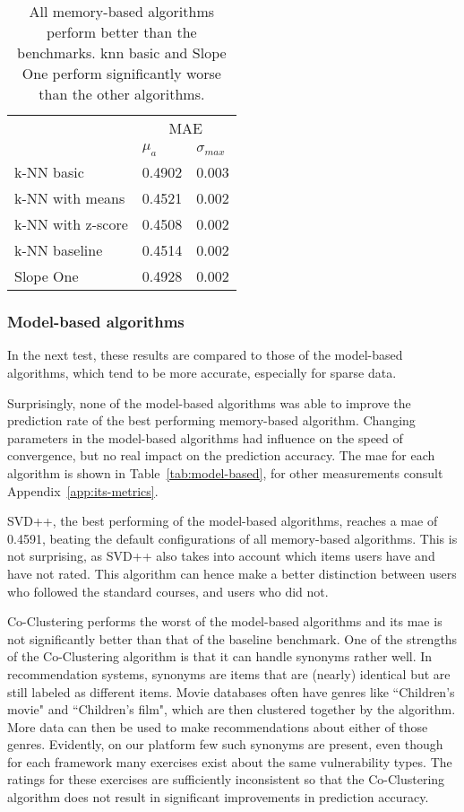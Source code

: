 \begin{table}
    \centering
    \caption[Prediction performance of memory-based algorithms]{All memory-based algorithms perform better than the benchmarks. \gls{knn} basic and Slope One perform significantly worse than the other algorithms.}
    \label{tab:memory-based}
    \small
    \begin{tabular}{l ll}
                 & \multicolumn{2}{c}{MAE}\\
    \cline{2-3} 
    & $\mu_a$ & $\sigma_{max}$\\
    \hline
k-NN basic        & 0.4902 & 0.003 \\ 
k-NN with means   & 0.4521 & 0.002 \\ 
k-NN with z-score & 0.4508 & 0.002 \\ 
k-NN baseline     & 0.4514 & 0.002 \\ 
Slope One         & 0.4928 & 0.002 \\
    \end{tabular}
\end{table}

\subsubsection{Model-based algorithms}
In the next test, these results are compared to those of the model-based algorithms, which tend to be more accurate, especially for sparse data.

Surprisingly, none of the model-based algorithms was able to improve the prediction rate of the best performing memory-based algorithm.
Changing parameters in the model-based algorithms had influence on the speed of convergence, but no real impact on the prediction accuracy.
The \gls{mae} for each algorithm is shown in Table~\ref{tab:model-based}, for other measurements consult Appendix~\ref{app:its-metrics}.

SVD++, the best performing of the model-based algorithms, reaches a \gls{mae} of 0.4591, beating the default configurations of all memory-based algorithms.
This is not surprising, as SVD++ also takes into account which items users have and have not rated.
This algorithm can hence make a better distinction between users who followed the standard courses, and users who did not.

Co-Clustering performs the worst of the model-based algorithms and its \gls{mae} is not significantly better than that of the baseline benchmark.
One of the strengths of the Co-Clustering algorithm is that it can handle synonyms rather well.
In recommendation systems, synonyms are items that are (nearly) identical but are still labeled as different items.
Movie databases often have genres like ``Children's movie" and ``Children's film", which are then clustered together by the algorithm.
More data can then be used to make recommendations about either of those genres.
Evidently, on our platform few such synonyms are present, even though for each framework many exercises exist about the same vulnerability types.
The ratings for these exercises are sufficiently inconsistent so that the Co-Clustering algorithm does not result in significant improvements in prediction accuracy.

